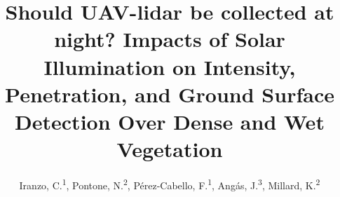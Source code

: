 \documentclass{isprs} %
\begin{document}
\title{Should UAV-lidar be collected at night? Impacts of Solar Illumination on Intensity, Penetration, and Ground Surface Detection Over Dense and Wet Vegetation}

\author{
    Iranzo, C.\textsuperscript{1},
    Pontone, N.\textsuperscript{2},
    Pérez-Cabello, F.\textsuperscript{1},
    Angás, J.\textsuperscript{3},
    Millard, K.\textsuperscript{2}
}

\address{
\textsuperscript{1 }Institute of Research into Environmental Sciences of Aragón (IUCA), Universidad de Zaragoza, C/ Pedro Cerbuna, 12, Zaragoza, 50009, Zaragoza, Spain - (c.iranzo, fcabello)@unizar.es\\
\textsuperscript{2 }Department of Geography and Environmental Studies, Carleton University, 1125 Colonel By Drive, Ottawa, Ontario, K1S5B6, Canada - koreen\_millard@carleton.ca; NicholasPontone@cmail.carleton.ca\\
\textsuperscript{3 }Department of Ancient Sciences and Institute of Heritage and Humanities (IPH), ARAID-University of Zaragoza, 50009 Zaragoza, Spain - j.angas@unizar.es\\
}



\end{document}
